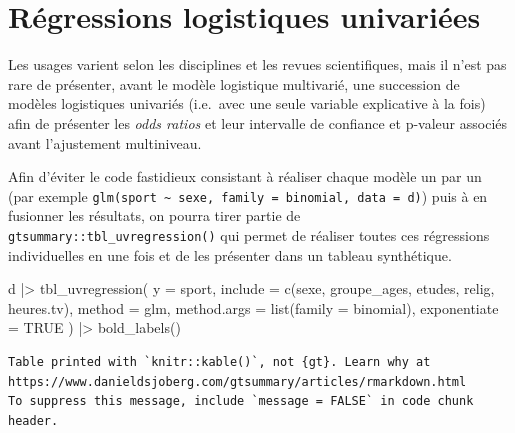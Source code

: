 \documentclass[
  letterpaper,
  DIV=11,
  numbers=noendperiod,
  oneside]{scrreprt}
\newenvironment{Shaded}{\begin{snugshade}}{\end{snugshade}}
\newcommand{\AttributeTok}[1]{\textcolor[rgb]{0.40,0.45,0.13}{#1}}
\newcommand{\ConstantTok}[1]{\textcolor[rgb]{0.56,0.35,0.01}{#1}}
\newcommand{\FunctionTok}[1]{\textcolor[rgb]{0.28,0.35,0.67}{#1}}
\newcommand{\NormalTok}[1]{\textcolor[rgb]{0.00,0.23,0.31}{#1}}
\newcommand{\SpecialCharTok}[1]{\textcolor[rgb]{0.37,0.37,0.37}{#1}}
\begin{document}
\hypertarget{ruxe9gressions-logistiques-univariuxe9es}{%
\section{Régressions logistiques
univariées}\label{ruxe9gressions-logistiques-univariuxe9es}}

Les usages varient selon les disciplines et les revues scientifiques,
mais il n'est pas rare de présenter, avant le modèle logistique
multivarié, une succession de modèles logistiques univariés (i.e.~avec
une seule variable explicative à la fois) afin de présenter les
\emph{odds ratios} et leur intervalle de confiance et p-valeur associés
avant l'ajustement multiniveau.

Afin d'éviter le code fastidieux consistant à réaliser chaque modèle un
par un (par exemple
\texttt{glm(sport\ \textasciitilde{}\ sexe,\ family\ =\ binomial,\ data\ =\ d)})
puis à en fusionner les résultats, on pourra tirer partie de
\texttt{gtsummary::tbl\_uvregression()} qui permet de réaliser toutes
ces régressions individuelles en une fois et de les présenter dans un
tableau synthétique.

\begin{Shaded}
\begin{Highlighting}[]
\NormalTok{d }\SpecialCharTok{|\textgreater{}}
  \FunctionTok{tbl\_uvregression}\NormalTok{(}
    \AttributeTok{y =}\NormalTok{ sport,}
    \AttributeTok{include =} \FunctionTok{c}\NormalTok{(sexe, groupe\_ages, etudes, relig, heures.tv),}
    \AttributeTok{method =}\NormalTok{ glm,}
    \AttributeTok{method.args =} \FunctionTok{list}\NormalTok{(}\AttributeTok{family =}\NormalTok{ binomial),}
    \AttributeTok{exponentiate =} \ConstantTok{TRUE}
\NormalTok{  ) }\SpecialCharTok{|\textgreater{}} 
  \FunctionTok{bold\_labels}\NormalTok{()}
\end{Highlighting}
\end{Shaded}

\begin{verbatim}
Table printed with `knitr::kable()`, not {gt}. Learn why at
https://www.danieldsjoberg.com/gtsummary/articles/rmarkdown.html
To suppress this message, include `message = FALSE` in code chunk header.
\end{verbatim}
\end{document}
